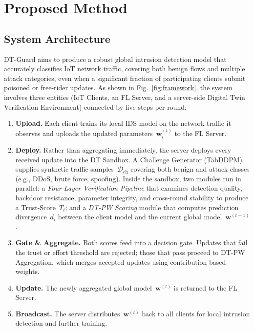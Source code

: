 \documentclass[conference]{IEEEtran}
\newcommand{\cmark}[1]{\raisebox{.5pt}{\textcircled{\raisebox{-.9pt}{\scriptsize\bfseries #1}}}}
\begin{document}
\section{Proposed Method}

\subsection{System Architecture}

DT-Guard aims to produce a robust global intrusion detection model that accurately classifies IoT network traffic, covering both benign flows and multiple attack categories, even when a significant fraction of participating clients submit poisoned or free-rider updates. As shown in Fig.~\ref{fig:framework}, the system involves three entities (IoT Clients, an FL Server, and a server-side Digital Twin Verification Environment) connected by five steps per round:

\begin{enumerate}
    \item[\cmark{1}] \textbf{Upload.} Each client trains its local IDS model on the network traffic it observes and uploads the updated parameters~$\mathbf{w}_i^{(t)}$ to the FL Server.
    \item[\cmark{2}] \textbf{Deploy.} Rather than aggregating immediately, the server deploys every received update into the DT Sandbox. A Challenge Generator (TabDDPM) supplies synthetic traffic samples~$\mathcal{D}_{\text{ch}}$ covering both benign and attack classes (e.g., DDoS, brute force, spoofing). Inside the sandbox, two modules run in parallel: a \emph{Four-Layer Verification Pipeline} that examines detection quality, backdoor resistance, parameter integrity, and cross-round stability to produce a Trust-Score~$T_i$; and a \emph{DT-PW Scoring} module that computes prediction divergence~$d_i$ between the client model and the current global model~$\mathbf{w}^{(t-1)}$.
    \item[\cmark{3}] \textbf{Gate \& Aggregate.} Both scores feed into a decision gate. Updates that fail the trust or effort threshold are rejected; those that pass proceed to DT-PW Aggregation, which merges accepted updates using contribution-based weights.
    \item[\cmark{4}] \textbf{Update.} The newly aggregated global model~$\mathbf{w}^{(t)}$ is returned to the FL Server.
    \item[\cmark{5}] \textbf{Broadcast.} The server distributes~$\mathbf{w}^{(t)}$ back to all clients for local intrusion detection and further training.
\end{enumerate}
\end{document}

